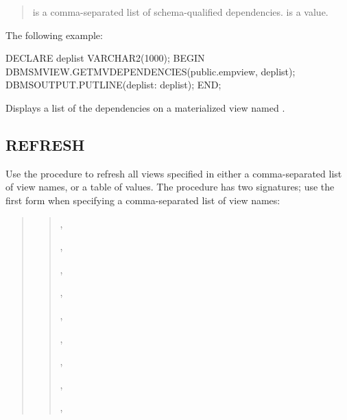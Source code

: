 \documentclass[letterpaper,10pt,english,openany,oneside]{sphinxmanual}
\begin{document}
\begin{quote}

 is a comma-separated list of schema-qualified
dependencies.  is a  value.
\end{quote}


The following example:

%
\begin{sphinxVerbatim}[commandchars=\\\{\}]
DECLARE
  deplist VARCHAR2(1000);
BEGIN
  DBMS\PYGZus{}MVIEW.GET\PYGZus{}MV\PYGZus{}DEPENDENCIES(\PYGZsq{}public.emp\PYGZus{}view\PYGZsq{}, deplist);
  DBMS\PYGZus{}OUTPUT.PUT\PYGZus{}LINE(\PYGZsq{}deplist: \PYGZsq{} \textbar{}\textbar{} deplist);
END;
\end{sphinxVerbatim}

Displays a list of the dependencies on a materialized view named
.

\newpage


\subsection{REFRESH}
\label{\detokenize{refresh::doc}}\label{\detokenize{refresh:refresh}}
Use the  procedure to refresh all views specified in either a
comma-separated list of view names, or a table of
 values. The procedure has two signatures; use
the first form when specifying a comma-separated list of view names:
\begin{quote}

\begin{quote}

,

,

,

,

,

,

,

,

,

\end{quote}
\end{quote}
\end{document}
